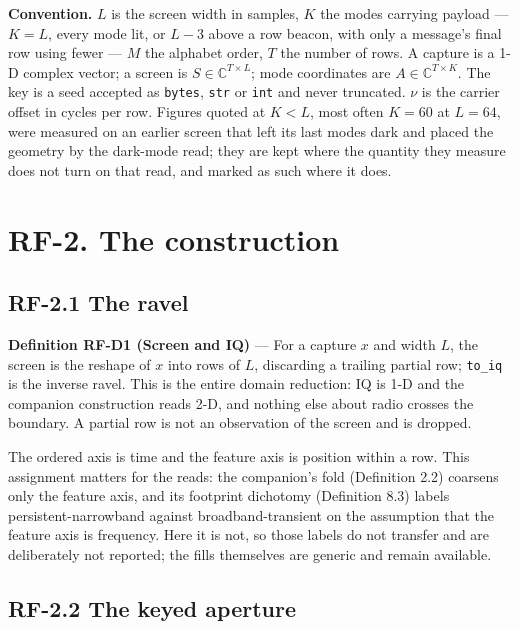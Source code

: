 \documentclass[10pt,letterpaper,twocolumn]{article}
\begin{document}
\textbf{Convention.} \(L\) is the screen width in samples, \(K\) the modes carrying payload --- \(K = L\), every mode lit, or \(L - 3\) above a row beacon, with only a message's final row using fewer --- \(M\) the alphabet order, \(T\) the number of rows. A capture is a 1-D complex vector; a screen is \(S \in \mathbb{C}^{T \times L}\); mode coordinates are \(A \in \mathbb{C}^{T \times K}\). The key is a seed accepted as \texttt{bytes}, \texttt{str} or \texttt{int} and never truncated. \(\nu\) is the carrier offset in cycles per row. Figures quoted at \(K < L\), most often \(K = 60\) at \(L = 64\), were measured on an earlier screen that left its last modes dark and placed the geometry by the dark-mode read; they are kept where the quantity they measure does not turn on that read, and marked as such where it does.

\section{RF-2. The construction}\label{rf-2-the-construction}

\subsection{RF-2.1 The ravel}\label{rf-21-the-ravel}

\textbf{Definition RF-D1 (Screen and IQ)} --- For a capture \(x\) and width \(L\), the screen is the reshape of \(x\) into rows of \(L\), discarding a trailing partial row; \texttt{to\_\allowbreak{}iq} is the inverse ravel. This is the entire domain reduction: IQ is 1-D and the companion construction reads 2-D, and nothing else about radio crosses the boundary. A partial row is not an observation of the screen and is dropped.

The ordered axis is time and the feature axis is position within a row. This assignment matters for the reads: the companion's fold (Definition 2.2) coarsens only the feature axis, and its footprint dichotomy (Definition 8.3) labels persistent-narrowband against broadband-transient on the assumption that the feature axis is frequency. Here it is not, so those labels do not transfer and are deliberately not reported; the fills themselves are generic and remain available.

\subsection{RF-2.2 The keyed aperture}\label{rf-22-the-keyed-aperture}
\end{document}
